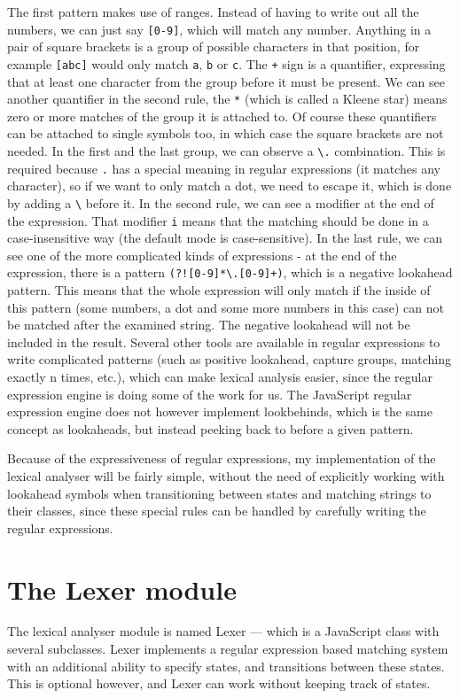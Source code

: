 The first pattern makes use of ranges. Instead of having to write out all the numbers, we can just say \texttt{[0-9]}, which will match any number. Anything in a pair of square brackets is a group of possible characters in that position, for example \texttt{[abc]} would only match \texttt{a}, \texttt{b} or \texttt{c}. The \texttt{+} sign is a quantifier, expressing that at least one character from the group before it must be present. We can see another quantifier in the second rule, the \texttt{*} (which is called a Kleene star) means zero or more matches of the group it is attached to. Of course these quantifiers can be attached to single symbols too, in which case the square brackets are not needed. In the first and the last group, we can observe a \texttt{\textbackslash.} combination. This is required because \texttt{.} has a special meaning in regular expressions (it matches any character), so if we want to only match a dot, we need to escape it, which is done by adding a \texttt{\textbackslash} before it. In the second rule, we can see a modifier at the end of the expression. That modifier \texttt{i} means that the matching should be done in a case-insensitive way (the default mode is case-sensitive). In the last rule, we can see one of the more complicated kinds of expressions - at the end of the expression, there is a pattern \texttt{(?![0-9]*\textbackslash.[0-9]+)}, which is a negative lookahead pattern. This means that the whole expression will only match if the inside of this pattern (some numbers, a dot and some more numbers in this case) can not be matched after the examined string. The negative lookahead will not be included in the result. Several other tools are available in regular expressions to write complicated patterns (such as positive lookahead, capture groups, matching exactly n times, etc.), which can make lexical analysis easier, since the regular expression engine is doing some of the work for us. The JavaScript regular expression engine does not however implement lookbehinds, which is the same concept as lookaheads, but instead peeking back to before a given pattern.

Because of the expressiveness of regular expressions, my implementation of the lexical analyser will be fairly simple, without the need of explicitly working with lookahead symbols when transitioning between states and matching strings to their classes, since these special rules can be handled by carefully writing the regular expressions.
\section{The Lexer module}
The lexical analyser module is named Lexer --- which is a JavaScript class with several subclasses. Lexer implements a regular expression based matching system with an additional ability to specify states, and transitions between these states. This is optional however, and Lexer can work without keeping track of states.

